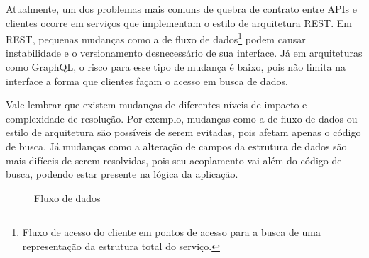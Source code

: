 Atualmente, um dos problemas mais comuns de quebra de contrato entre APIs e clientes ocorre em serviços que implementam o estilo de arquitetura REST. Em REST, pequenas mudanças como a de fluxo de dados\footnote{
  Fluxo de acesso do cliente em pontos de acesso para a busca de uma representação da estrutura total do serviço.
} podem causar instabilidade e o versionamento desnecessário de sua interface. Já em arquiteturas como GraphQL, o risco para esse tipo de mudança é baixo, pois não limita na interface a forma que clientes façam o acesso em busca de dados.

Vale lembrar que existem mudanças de diferentes níveis de impacto e complexidade de resolução. Por exemplo, mudanças como a de fluxo de dados ou estilo de arquitetura são possíveis de serem evitadas, pois afetam apenas o código de busca. Já mudanças como a alteração de campos da estrutura de dados são mais difíceis de serem resolvidas, pois seu acoplamento vai além do código de busca, podendo estar presente na lógica da aplicação.

\begin{figure}[H]
  \centering
  \caption{Fluxo de dados}
\end{figure}


